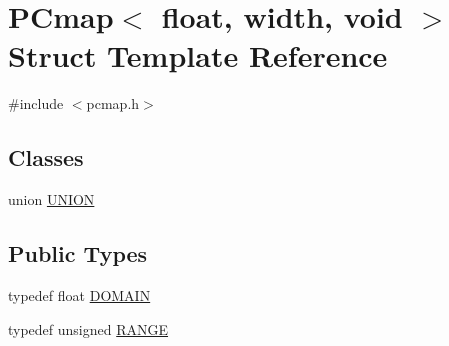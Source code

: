 \hypertarget{struct_p_cmap_3_01float_00_01width_00_01void_01_4}{}\section{P\+Cmap$<$ float, width, void $>$ Struct Template Reference}
\label{struct_p_cmap_3_01float_00_01width_00_01void_01_4}


{\ttfamily \#include $<$pcmap.\+h$>$}

\subsection*{Classes}
\begin{DoxyCompactItemize}
\item 
union \hyperlink{union_p_cmap_3_01float_00_01width_00_01void_01_4_1_1_u_n_i_o_n}{U\+N\+I\+O\+N}
\end{DoxyCompactItemize}
\subsection*{Public Types}
\begin{DoxyCompactItemize}
\item 
typedef float \hyperlink{struct_p_cmap_3_01float_00_01width_00_01void_01_4_a0d5674e8d0baa55f3da9200f872fb69f}{D\+O\+M\+A\+I\+N}
\item 
typedef unsigned \hyperlink{struct_p_cmap_3_01float_00_01width_00_01void_01_4_a7f454607f3a289956d80e866ca3218ba}{R\+A\+N\+G\+E}
\end{DoxyCompactItemize}
